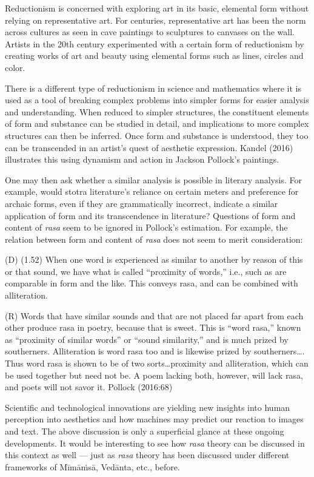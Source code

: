 Reductionism is concerned with exploring art in its basic, elemental form without relying on representative art. For centuries, representative art has been the norm across cultures as seen in cave paintings to sculptures to canvases on the wall. Artists in the 20th century experimented with a certain form of reductionism by creating works of art and beauty using elemental forms such as lines, circles and color. 

There is a different type of reductionism in science and mathematics where it is used as a tool of breaking complex problems into simpler forms for easier analysis and understanding. When reduced to simpler structures, the constituent elements of form and substance can be studied in detail, and implications to more complex structures can then be inferred. Once form and substance is understood, they too can be transcended in an artist’s quest of aesthetic expression. Kandel (2016) illustrates this using dynamism and action in Jackson Pollock’s paintings. 

One may then ask whether a similar analysis is possible in literary analysis. For example, would stotra literature’s reliance on certain meters and preference for archaic forms, even if they are grammatically incorrect, indicate a similar application of form and its transcendence in literature? Questions of form and content of \textsl{rasa} seem to be ignored in Pollock’s estimation. For example, the relation between form and content of \textsl{rasa} does not seem to merit consideration:

\begin{myquote}
(D) (1.52) When one word is experienced as similar to another by reason of this or that sound, we have what is called “proximity of words,” i.e., such as are comparable in form and the like. This conveys rasa, and can be combined with alliteration.

(R) Words that have similar sounds and that are not placed far apart from each other produce rasa in poetry, because that is sweet. This is “word rasa,” known as “proximity of similar words” or “sound similarity,” and is much prized by southerners. Alliteration is word rasa too and is likewise prized by southerners…. Thus word rasa is shown to be of two sorts…proximity and alliteration, which can be used together but need not be. A poem lacking both, however, will lack rasa, and poets will not savor it.
\hfill Pollock (2016:68)
\end{myquote}

Scientific and technological innovations are yielding new insights into human perception into aesthetics and how machines may predict our reaction to images and text. The above discussion is only a superficial glance at these ongoing developments. It would be interesting to see how \textsl{rasa} theory can be discussed in this context as well --- just as \textsl{rasa} theory has been discussed under different frameworks of Mīmāṁsā, Vedānta, etc., before. 

